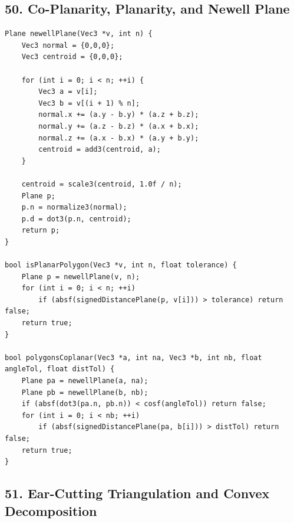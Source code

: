 \documentclass[10pt,letterpaper]{article}
\begin{document}
\subsection*{50. Co-Planarity, Planarity, and Newell Plane}

\begin{verbatim}
Plane newellPlane(Vec3 *v, int n) {
    Vec3 normal = {0,0,0};
    Vec3 centroid = {0,0,0};

    for (int i = 0; i < n; ++i) {
        Vec3 a = v[i];
        Vec3 b = v[(i + 1) % n];
        normal.x += (a.y - b.y) * (a.z + b.z);
        normal.y += (a.z - b.z) * (a.x + b.x);
        normal.z += (a.x - b.x) * (a.y + b.y);
        centroid = add3(centroid, a);
    }

    centroid = scale3(centroid, 1.0f / n);
    Plane p;
    p.n = normalize3(normal);
    p.d = dot3(p.n, centroid);
    return p;
}

bool isPlanarPolygon(Vec3 *v, int n, float tolerance) {
    Plane p = newellPlane(v, n);
    for (int i = 0; i < n; ++i)
        if (absf(signedDistancePlane(p, v[i])) > tolerance) return false;
    return true;
}

bool polygonsCoplanar(Vec3 *a, int na, Vec3 *b, int nb, float angleTol, float distTol) {
    Plane pa = newellPlane(a, na);
    Plane pb = newellPlane(b, nb);
    if (absf(dot3(pa.n, pb.n)) < cosf(angleTol)) return false;
    for (int i = 0; i < nb; ++i)
        if (absf(signedDistancePlane(pa, b[i])) > distTol) return false;
    return true;
}
\end{verbatim}


\subsection*{51. Ear-Cutting Triangulation and Convex Decomposition}
\end{document}
